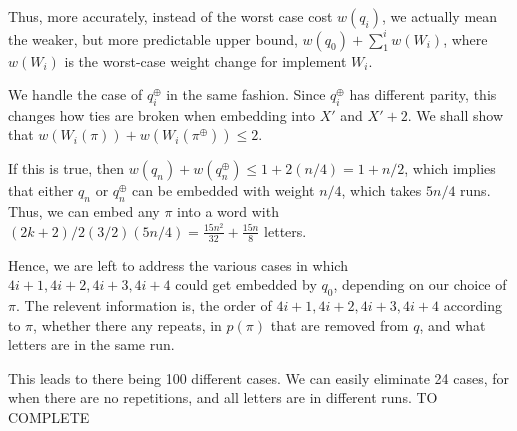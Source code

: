 \documentclass{article}
\begin{document}
Thus, more accurately, instead of the worst case cost $w(q_i)$, we actually mean the weaker, but more predictable upper bound, $w(q_0) + \sum_1^i w(W_i)$, where $w(W_i)$ is the worst-case weight change for implement $W_i$.


We handle the case of $q^\oplus_i$ in the same fashion. Since $q^\oplus_i$ has different parity, this changes how ties are broken when embedding into $X'$ and $X'+2$. We shall show that $w(W_i(\pi))+w(W_i(\pi^\oplus)) \le 2$.

If this is true, then $w(q_n)+w(q_n^\oplus) \le 1+2(n/4) = 1+n/2$, which implies that either $q_n$ or $q_n^\oplus$ can be embedded with weight $n/4$, which takes $5n/4$ runs. Thus, we can embed any $\pi$ into a word with $(2k+2)/2(3/2)(5n/4) = \frac{15n^2}{32} +\frac{15n}{8}$ letters.

Hence, we are left to address the various cases in which $4i+1,4i+2,4i+3,4i+4$ could get embedded by $q_0$, depending on our choice of $\pi$. The relevent information is, the order of $4i+1,4i+2,4i+3,4i+4$ according to $\pi$, whether there any repeats, in $p(\pi)$ that are removed from $q$, and what letters are in the same run. 

This leads to there being 100 different cases.  We can easily eliminate 24 cases, for when there are no repetitions, and all letters are in different runs. TO COMPLETE 
\fi
\end{document}

